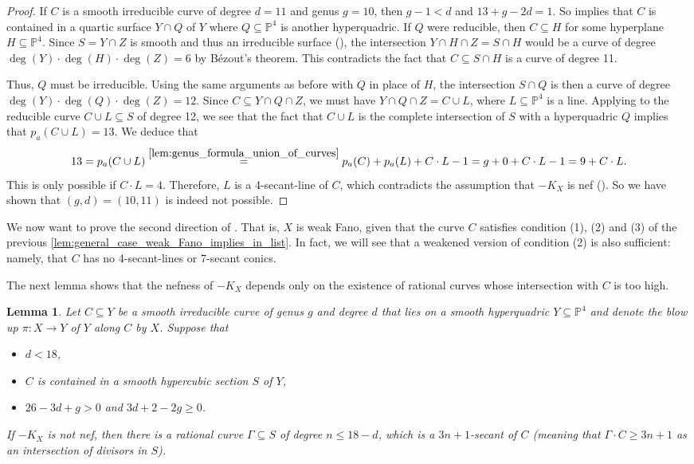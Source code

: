 \documentclass[english,11pt,reqno]{amsart}
\newcommand{\sub}{\subseteq}
\newcommand{\Pfour}{\mathbb{P}^4}
\newtheorem{lem}[thm]{Lemma}
\begin{document}
\begin{proof}
If $C$ is a smooth irreducible curve of degree $d=11$ and genus $g=10$, then $g-1<d$ and $13+g-2d=1$. So  implies that $C$ is contained in a quartic surface $Y\cap Q$ of $Y$ where $Q\sub \Pfour$ is another hyperquadric. If $Q$ were reducible, then $C \sub H$ for some hyperplane $H\sub \Pfour$. Since $S=Y\cap Z$ is smooth and thus an irreducible surface (), the intersection $Y\cap H \cap Z= S \cap H$ would be a curve of degree $\deg(Y)\cdot \deg(H)\cdot \deg(Z)=6$ by Bézout's theorem. This contradicts the fact that $C\sub S\cap H$ is a curve of degree 11. \par 
Thus, $Q$ must be irreducible. Using the same arguments as before with $Q$ in place of $H$, the intersection $S \cap Q$ is then a curve of degree $\deg(Y)\cdot \deg(Q)\cdot \deg(Z)=12$. Since $C\sub Y\cap Q \cap Z$, we must have $Y\cap Q \cap Z=C\cup L$, where $L\sub \Pfour$ is a line. Applying  to the reducible curve $C\cup L \sub S$ of degree 12, we see that the fact that $C\cup L$ is the complete intersection of $S$ with a hyperquadric $Q$ implies that $p_a(C\cup L)=13$. We deduce that
$$13=p_a(C \cup L) \overset{\ref{lem:genus_formula_union_of_curves}}{=} p_a(C)+p_a(L)+C\cdot L-1= g+0+C\cdot L -1 = 9+C\cdot L.$$
This is only possible if $C\cdot L=4$. Therefore, $L$ is a 4-secant-line of $C$, which contradicts the assumption that $-K_X$ is nef (). So we have shown that $(g,d)=(10,11)$ is indeed not possible.
\end{proof}
%
We now want to prove the second direction of . That is, $X$ is weak Fano, given that the curve $C$ satisfies condition (1), (2) and (3) of the previous \cref{lem:general_case_weak_Fano_implies_in_list}. In fact, we will see that a weakened version of condition (2) is also sufficient: namely, that $C$ has no 4-secant-lines or 7-secant conics.  \par 
The next lemma shows that the nefness of $-K_X$ depends only on the existence of rational curves whose intersection with $C$ is too high. 
%
\begin{lem} \label{lem:not_nef_implies_3n+1_secant}
Let $C \sub Y$ be a smooth irreducible curve of genus $g$ and degree $d$ that lies on a smooth hyperquadric $Y \sub \Pfour$ and denote the blow up $\pi:X\rightarrow Y$ of $Y$ along $C$ by $X$. 
Suppose that \begin{itemize}
\item $d < 18$,
\item $C$ is contained in a smooth hypercubic section $S$ of $Y$,
\item $26-3d+g>0$ and $3d+2-2g\geq0$. 
\end{itemize} 
If $-K_X$ is not nef, then there is a rational curve $\Gamma \sub S$ of degree $n\leq 18-d$, which is a $3n+1$-secant of $C$ (meaning that $\Gamma \cdot C\geq 3n+1$ as an intersection of divisors in $S$).
\end{lem}
\end{document}
